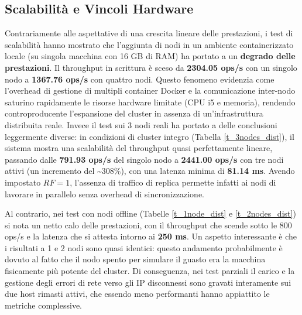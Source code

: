 \documentclass[12pt]{article}
\begin{document}
\subsection{Scalabilità e Vincoli Hardware}
Contrariamente alle aspettative di una crescita lineare delle prestazioni, i test di scalabilità hanno mostrato che l'aggiunta di nodi in un ambiente containerizzato locale (su singola macchina con 16 GB di RAM) ha portato a un \textbf{degrado delle prestazioni}. Il throughput in scrittura è sceso da \textbf{2304.05 ops/s} con un singolo nodo a \textbf{1367.76 ops/s} con quattro nodi. Questo fenomeno evidenzia come l'overhead di gestione di multipli container Docker e la comunicazione inter-nodo saturino rapidamente le risorse hardware limitate (CPU i5 e memoria), rendendo controproducente l'espansione del cluster in assenza di un'infrastruttura distribuita reale.\newline\newline
\noindent
Invece il test sui 3 nodi reali ha portato a delle conclusioni leggermente diverse: in condizioni di cluster integro (Tabella \ref{t_3nodes_dist}), il sistema mostra una scalabilità del throughput quasi perfettamente lineare, passando dalle \textbf{791.93 ops/s} del singolo nodo a \textbf{2441.00 ops/s} con tre nodi attivi (un incremento del \textasciitilde 308\%), con una latenza minima di \textbf{81.14 ms}. Avendo impostato $RF=1$, l'assenza di traffico di replica permette infatti ai nodi di lavorare in parallelo senza overhead di sincronizzazione.

Al contrario, nei test con nodi offline (Tabelle \ref{t_1node_dist} e \ref{t_2nodes_dist}) si nota un netto calo delle prestazioni, con il throughput che scende sotto le 800 ops/s e la latenza che si attesta intorno ai \textbf{250 ms}. Un aspetto interessante è che i risultati a 1 e 2 nodi sono quasi identici: questo andamento probabilmente è dovuto al fatto che il nodo spento per simulare il guasto era la macchina fisicamente più potente del cluster. Di conseguenza, nei test parziali il carico e la gestione degli errori di rete verso gli IP disconnessi sono gravati interamente sui due host rimasti attivi, che essendo meno performanti hanno appiattito le metriche complessive.
\end{document}
